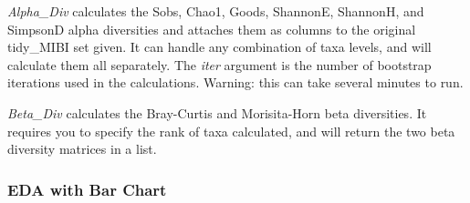 \documentclass[]{article}
\newenvironment{Shaded}{\begin{snugshade}}{\end{snugshade}}
\newcommand{\KeywordTok}[1]{\textcolor[rgb]{0.13,0.29,0.53}{\textbf{#1}}}
\newcommand{\DataTypeTok}[1]{\textcolor[rgb]{0.13,0.29,0.53}{#1}}
\newcommand{\DecValTok}[1]{\textcolor[rgb]{0.00,0.00,0.81}{#1}}
\newcommand{\StringTok}[1]{\textcolor[rgb]{0.31,0.60,0.02}{#1}}
\newcommand{\CommentTok}[1]{\textcolor[rgb]{0.56,0.35,0.01}{\textit{#1}}}
\newcommand{\OtherTok}[1]{\textcolor[rgb]{0.56,0.35,0.01}{#1}}
\newcommand{\OperatorTok}[1]{\textcolor[rgb]{0.81,0.36,0.00}{\textbf{#1}}}
\newcommand{\NormalTok}[1]{#1}
\begin{document}
\emph{Alpha\_Div} calculates the Sobs, Chao1, Goods, ShannonE, ShannonH,
and SimpsonD alpha diversities and attaches them as columns to the
original tidy\_MIBI set given. It can handle any combination of taxa
levels, and will calculate them all separately. The \emph{iter} argument
is the number of bootstrap iterations used in the calculations. Warning:
this can take several minutes to run.

\emph{Beta\_Div} calculates the Bray-Curtis and Morisita-Horn beta
diversities. It requires you to specify the rank of taxa calculated, and
will return the two beta diversity matrices in a list.

\begin{Shaded}
\end{Shaded}

\subsubsection{EDA with Bar Chart}\label{eda-with-bar-chart}

\begin{Shaded}
\end{Shaded}
\end{document}
